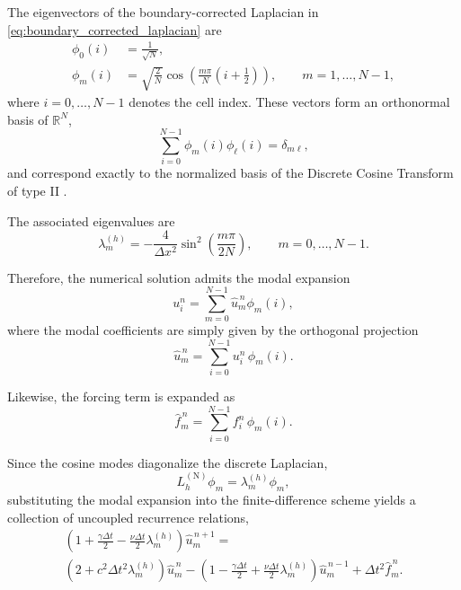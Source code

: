 \documentclass{Configuration_Files/PoliMi3i_thesis}
\begin{document}
The eigenvectors of the boundary-corrected Laplacian in
\eqref{eq:boundary_corrected_laplacian} are
\begin{align*}
\phi_0(i)
&=
\frac1{\sqrt N},
\\
\phi_m(i)
&=
\sqrt{\frac2N}
\cos\!\left(
\frac{m\pi}{N}
\left(i+\frac12\right)
\right),
\qquad
m=1,\ldots,N-1,
\end{align*}
where $i=0,\ldots,N-1$ denotes the cell index. These vectors form an
orthonormal basis of $\mathbb{R}^N$,
\begin{equation}
\label{eq:orthonormality}
\sum_{i=0}^{N-1}
\phi_m(i)\phi_\ell(i)
=
\delta_{m\ell},
\end{equation}
and correspond exactly to the normalized basis of the Discrete Cosine
Transform of type II \citep[DCT-II,][]{rao_discrete_1990}.

The associated eigenvalues are
\begin{equation*}
\lambda_m^{(h)}
=
-\frac{4}{\Delta x^2}
\sin^2\!\left(
\frac{m\pi}{2N}
\right),
\qquad
m=0,\ldots,N-1.
\end{equation*}

Therefore, the numerical solution admits the modal expansion
\begin{equation*}
u_i^n
=
\sum_{m=0}^{N-1}
\widehat u_m^{\,n}\phi_m(i),
\end{equation*}
where the modal coefficients are simply given by the orthogonal projection
\begin{equation*}
\widehat u_m^{\,n}
=
\sum_{i=0}^{N-1}
u_i^n\,\phi_m(i).
\end{equation*}

Likewise, the forcing term is expanded as
\begin{equation*}
\widehat f_m^{\,n}
=
\sum_{i=0}^{N-1}
f_i^n\,\phi_m(i).
\end{equation*}

Since the cosine modes diagonalize the discrete Laplacian,
\begin{equation*}
L_h^{(\mathrm N)}\phi_m
=
\lambda_m^{(h)}\phi_m,
\end{equation*}
substituting the modal expansion into the finite-difference scheme yields a
collection of uncoupled recurrence relations,
\begin{multline}
\left(
1+\frac{\gamma\Delta t}{2}
-
\frac{\nu\Delta t}{2}
\lambda_m^{(h)}
\right)
\widehat u_m^{\,n+1}
= \\
\left(
2
+
c^2\Delta t^2
\lambda_m^{(h)}
\right)
\widehat u_m^{\,n}
-
\left(
1-\frac{\gamma\Delta t}{2}
+
\frac{\nu\Delta t}{2}
\lambda_m^{(h)}
\right)
\widehat u_m^{\,n-1}
+
\Delta t^2\widehat f_m^{\,n}.
\end{multline}
\end{document}
